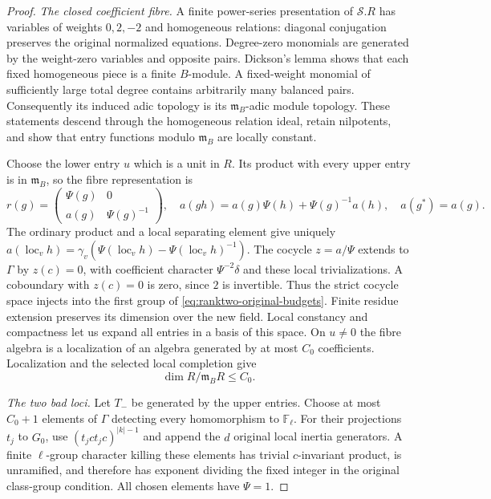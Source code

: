 \begin{proof}
\emph{The closed coefficient fibre.}
A finite power-series presentation of $\mathscr S.R$ has variables
of weights $0,2,-2$ and homogeneous relations: diagonal conjugation
preserves the original normalized equations.  Degree-zero monomials
are generated by the weight-zero variables and opposite pairs.
Dickson's lemma shows that each fixed homogeneous piece is a finite
$B$-module.  A fixed-weight monomial of sufficiently large total
degree contains arbitrarily many balanced pairs.  Consequently its
induced adic topology is its $\mathfrak m_B$-adic module topology.
These statements descend through the homogeneous relation ideal,
retain nilpotents, and show that entry functions modulo
$\mathfrak m_B$ are locally constant.

Choose the lower entry $u$ which is a unit in $R$.  Its product with
every upper entry is in $\mathfrak m_B$, so the fibre representation is
\[
 r(g)=\begin{pmatrix}\Psi(g)&0\\a(g)&\Psi(g)^{-1}\end{pmatrix},
 \quad a(gh)=a(g)\Psi(h)+\Psi(g)^{-1}a(h),\quad a(g^*)=a(g).
\]
The ordinary product and a local separating element give uniquely
$a(\operatorname{loc}_v h)=\gamma_v(\Psi(\operatorname{loc}_v h)
-\Psi(\operatorname{loc}_v h)^{-1})$.
The cocycle $z=a/\Psi$ extends to $\Gamma$ by $z(c)=0$, with
coefficient character $\Psi^{-2}\delta$ and these local
trivializations.  A coboundary with $z(c)=0$ is zero, since $2$ is
invertible.  Thus the strict cocycle space injects into the first
group of \eqref{eq:ranktwo-original-budgets}.  Finite residue
extension preserves its dimension over the new field.  Local
constancy and compactness let us expand all entries in a basis of
this space.  On $u\ne0$ the fibre algebra is a localization of an
algebra generated by at most $C_0$ coefficients.  Localization and
the selected local completion give
\begin{equation}\label{eq:ranktwo-fibre-dimension}
                         \dim R/\mathfrak m_BR\le C_0.
\end{equation}

\emph{The two bad loci.}
Let $T_-$ be generated by the upper entries.  Choose at most $C_0+1$
elements of $\Gamma$ detecting every homomorphism to
$\mathbb F_\ell$.  For their projections $t_j$ to $G_0$, use
$(t_jct_jc)^{|k|-1}$ and append the $d$ original local inertia
generators.  A finite $\ell$-group character killing these elements
has trivial $c$-invariant product, is unramified, and therefore has
exponent dividing the fixed integer in the original class-group
condition.  All chosen elements have $\Psi=1$.


\end{proof}
